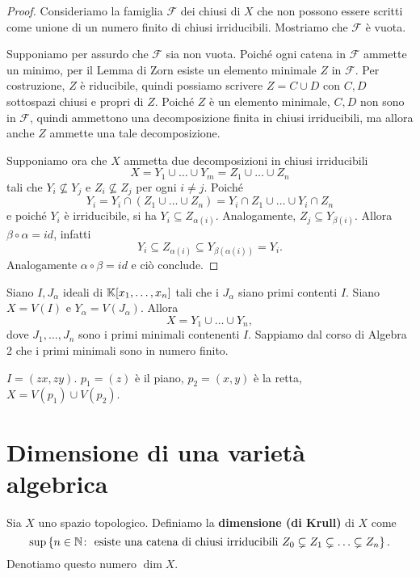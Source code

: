 \begin{proof}
    Consideriamo la famiglia $\mathcal{F}$ dei chiusi di $X$ che non possono essere scritti come unione di un numero finito di chiusi irriducibili. Mostriamo che $\mathcal{F}$ è vuota.

    Supponiamo per assurdo che $\mathcal{F}$ sia non vuota. Poiché ogni catena in $\mathcal{F}$ ammette un minimo, per il Lemma di Zorn esiste un elemento minimale $Z$ in $\mathcal{F}$. Per costruzione, $Z$ è riducibile, quindi possiamo scrivere $Z=C\cup D$ con $C,D$ sottospazi chiusi e propri di $Z$. Poiché $Z$ è un elemento minimale, $C,D$ non sono in $\mathcal{F}$, quindi ammettono una decomposizione finita in chiusi irriducibili, ma allora anche $Z$ ammette una tale decomposizione. 

    Supponiamo ora che $X$ ammetta due decomposizioni in chiusi irriducibili \[X=Y_1\cup\ldots\cup Y_m=Z_1\cup\ldots\cup Z_n\] tali che $Y_i\not\subseteq Y_j$ e $Z_i\not\subseteq Z_j$ per ogni $i\ne j$. Poiché \[Y_i=Y_i\cap (Z_1\cup\ldots\cup Z_n)=Y_i\cap Z_1\cup\ldots\cup Y_i\cap Z_n\] e poiché $Y_i$ è irriducibile, si ha $Y_i\subseteq Z_{\alpha(i)}$. Analogamente, $Z_j\subseteq Y_{\beta(i)}$. Allora $\beta\circ\alpha=id$, infatti \[Y_i\subseteq Z_{\alpha(i)}\subseteq Y_{\beta(\alpha(i))}=Y_i.\]
    Analogamente $\alpha\circ\beta=id$ e ciò conclude.
\end{proof}

\begin{remark}
    Siano $I,J_\alpha$ ideali di $\mathbb{K}[x_1,\ldots,x_n]$ tali che i $J_\alpha$ siano primi contenti $I$. Siano $X=V(I)$ e $Y_\alpha=V(J_\alpha)$. Allora 
    \[X=Y_1\cup \ldots \cup Y_n,\] 
    dove $J_1,\ldots,J_n$ sono i primi minimali contenenti $I$. Sappiamo dal corso di Algebra 2 che i primi minimali sono in numero finito.
\end{remark}

\begin{example}
    $I=(zx,zy)$. $p_1=(z)$ è il piano, $p_2=(x,y)$ è la retta, $X=V(p_1)\cup V(p_2)$.
\end{example}


\section{Dimensione di una varietà algebrica}

\begin{definition}
    Sia $X$ uno spazio topologico. Definiamo la \textbf{dimensione (di Krull)} di $X$ come 
    \[\sup\left\{n\in\mathbb{N} \colon \text{ esiste una catena di chiusi irriducibili } Z_0\subsetneq Z_1 \subsetneq \ldots \subsetneq Z_n\right\}.\]
    Denotiamo questo numero $\dim X$.
\end{definition}


